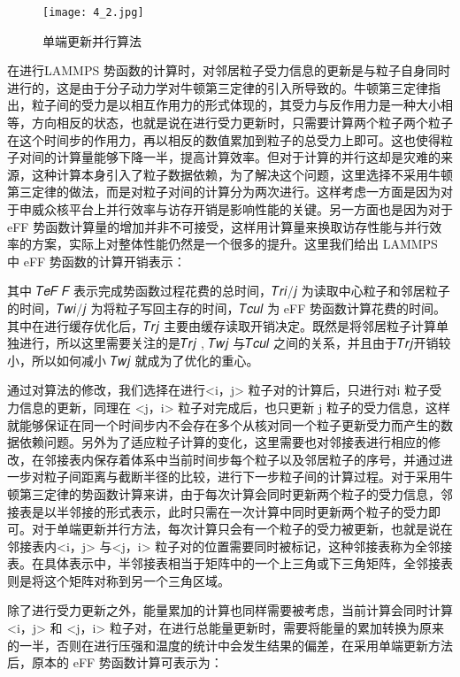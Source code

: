  \begin{figure}[h]
  \centering
  \texttt{[image: 4\_2.jpg]}
  \caption{单端更新并行算法}
  \label{fig:badge}
\end{figure}

在进行LAMMPS 势函数的计算时，对邻居粒子受力信息的更新是与粒子自身同时进行的，这是由于分子动力学对牛顿第三定律的引入所导致的。牛顿第三定律指出，粒子间的受力是以相互作用力的形式体现的，其受力与反作用力是一种大小相等，方向相反的状态，也就是说在进行受力更新时，只需要计算两个粒子两个粒子在这个时间步的作用力，再以相反的数值累加到粒子的总受力上即可。这也使得粒子对间的计算量能够下降一半，提高计算效率。但对于计算的并行这却是灾难的来源，这种计算本身引入了粒子数据依赖，为了解决这个问题，这里选择不采用牛顿第三定律的做法，而是对粒子对间的计算分为两次进行。这样考虑一方面是因为对于申威众核平台上并行效率与访存开销是影响性能的关键。另一方面也是因为对于eFF 势函数计算量的增加并非不可接受，这样用计算量来换取访存性能与并行效率的方案，实际上对整体性能仍然是一个很多的提升。这里我们给出 LAMMPS 中 eFF 势函数的计算开销表示：

其中 𝑇𝑒𝐹 𝐹 表示完成势函数过程花费的总时间，𝑇𝑟𝑖/𝑗 为读取中心粒子和邻居粒子的时间，𝑇𝑤𝑖/𝑗 为将粒子写回主存的时间，𝑇𝑐𝑢𝑙 为 eFF 势函数计算花费的时间。其中在进行缓存优化后，𝑇𝑟𝑗 主要由缓存读取开销决定。既然是将邻居粒子计算单独进行，所以这里需要关注的是𝑇𝑟𝑗 , 𝑇𝑤𝑗 与𝑇𝑐𝑢𝑙 之间的关系，并且由于𝑇𝑟𝑗开销较小，所以如何减小 𝑇𝑤𝑗 就成为了优化的重心。

通过对算法的修改，我们选择在进行<i，j> 粒子对的计算后，只进行对i 粒子受力信息的更新，同理在 <j，i> 粒子对完成后，也只更新 j 粒子的受力信息，这样就能够保证在同一个时间步内不会存在多个从核对同一个粒子更新受力而产生的数据依赖问题。另外为了适应粒子计算的变化，这里需要也对邻接表进行相应的修改，在邻接表内保存着体系中当前时间步每个粒子以及邻居粒子的序号，并通过进一步对粒子间距离与截断半径的比较，进行下一步粒子间的计算过程。对于采用牛顿第三定律的势函数计算来讲，由于每次计算会同时更新两个粒子的受力信息，邻接表是以半邻接的形式表示，此时只需在一次计算中同时更新两个粒子的受力即可。对于单端更新并行方法，每次计算只会有一个粒子的受力被更新，也就是说在邻接表内<i，j> 与<j，i> 粒子对的位置需要同时被标记，这种邻接表称为全邻接表。在具体表示中，半邻接表相当于矩阵中的一个上三角或下三角矩阵，全邻接表则是将这个矩阵对称到另一个三角区域。

除了进行受力更新之外，能量累加的计算也同样需要被考虑，当前计算会同时计算 <i，j> 和 <j，i> 粒子对，在进行总能量更新时，需要将能量的累加转换为原来的一半，否则在进行压强和温度的统计中会发生结果的偏差，在采用单端更新方法后，原本的 eFF 势函数计算可表示为：

